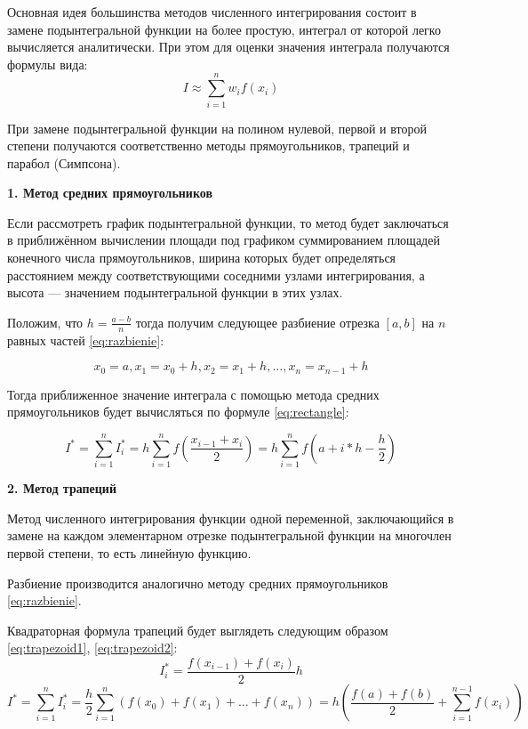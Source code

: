 \documentclass[a4paper, 12pt]{article}   	%
\begin{document}
Основная идея большинства методов численного интегрирования состоит в замене подынтегральной функции на более простую, интеграл от которой легко вычисляется аналитически. При этом для оценки значения интеграла получаются формулы вида:
$$I \approx \sum_{i=1}^{n} w_i f(x_i)$$

При замене подынтегральной функции на полином нулевой, первой и второй степени получаются соответственно методы прямоугольников, трапеций и парабол (Симпсона).

\textbf{1. Метод средних прямоугольников}

Если рассмотреть график подынтегральной функции, то метод будет заключаться в приближённом вычислении площади под графиком суммированием площадей конечного числа прямоугольников, ширина которых будет определяться расстоянием между соответствующими соседними узлами интегрирования, а высота — значением подынтегральной функции в этих узлах.

Положим, что $h = \frac{a-b}{n}$ тогда получим следующее разбиение отрезка $[a, b]$ на $n$ равных частей \eqref{eq:razbienie}:

\begin{equation}\label{eq:razbienie}
x_0 = a, x_1 = x_0 + h, x_2 = x_1 + h, ..., x_n = x_{n-1} + h
\end{equation}


Тогда приближенное значение интеграла с помощью метода средних прямоугольников будет вычисляться по формуле \eqref{eq:rectangle}:

\begin{equation}\label{eq:rectangle}
I^* = \sum_{i=1}^{n} I_{i}^{*} =h \sum_{i=1}^{n} f (\frac{x_{i-1} + x_i}{2}) = h \sum_{i=1}^{n} f(a + i * h - \frac{h}{2})
\end{equation}

\textbf{2. Метод трапеций}

Метод численного интегрирования функции одной переменной, заключающийся в замене на каждом элементарном отрезке подынтегральной функции на многочлен первой степени, то есть линейную функцию. 

Разбиение производится аналогично методу средних прямоугольников \eqref{eq:razbienie}.

Квадраторная формула трапеций будет выглядеть следующим образом \eqref{eq:trapezoid1}, \eqref{eq:trapezoid2}:
\begin{equation}\label{eq:trapezoid1}
I^*_i = \frac{f(x_{i-1})+f(x_i)}{2} h
\end{equation}
\begin{equation}\label{eq:trapezoid2}
I^* = \sum_{i=1}^{n} I_{i}^{*} = \frac{h}{2} \sum_{i=1}^{n} (f(x_0) + f(x_1) + ... + f(x_n)) = h (\frac{f(a)+f(b)}{2} + \sum_{i=1}^{n-1} f(x_i))
\end{equation}
\end{document}
